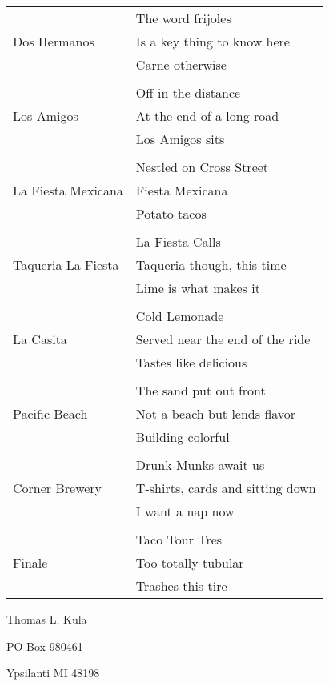 \documentclass[12pt]{article}
\begin{document}
\begin{tabular}{p{4cm}p{\textwidth}}
\multirow{3}{*}{Dos Hermanos} & The word frijoles \\
 & Is a key thing to know here \\
 & Carne otherwise  \\
 & \\
\multirow{3}{*}{Los Amigos} & Off in the distance \\
 & At the end of a long road \\
 & Los Amigos sits \\
 & \\
\multirow{3}{*}{La Fiesta Mexicana} & Nestled on Cross Street \\
 & Fiesta Mexicana \\
 & Potato tacos \\
 & \\
\multirow{3}{*}{Taqueria La Fiesta} & La Fiesta Calls \\
 & Taqueria though, this time \\
 & Lime is what makes it \\
 & \\
\multirow{3}{*}{La Casita} & Cold Lemonade \\
 & Served near the end of the ride \\
 & Tastes like delicious \\
 & \\
\multirow{3}{*}{Pacific Beach} & The sand put out front \\
 & Not a beach but lends flavor \\
 & Building colorful \\
 & \\
\multirow{3}{*}{Corner Brewery} & Drunk Munks await us \\
 & T-shirts, cards and sitting down \\
 & I want a nap now \\
 & \\
\multirow{3}{*}{Finale} & Taco Tour Tres \\
 & Too totally tubular \\
 & Trashes this tire \\
\end{tabular}

\newpage

\thispagestyle{empty}
\vspace*{14cm}
\begin{sideways}
\Large{Thomas L. Kula}
\end{sideways}
\begin{sideways}
\Large{PO Box 980461}
\end{sideways}
\begin{sideways}
\Large{Ypsilanti MI 48198}
\end{sideways}
\end{document}
